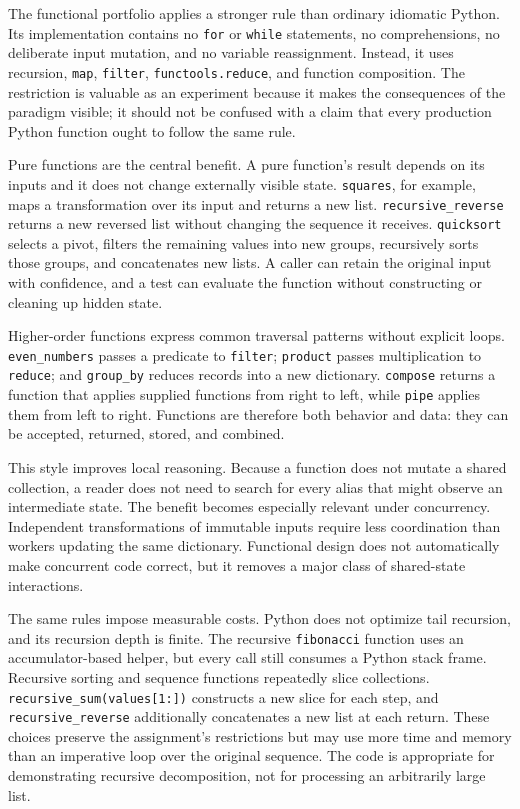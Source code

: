 \documentclass[12pt]{article}
\begin{document}
The functional portfolio applies a stronger rule than ordinary idiomatic Python. Its implementation contains no \texttt{for} or \texttt{while} statements, no comprehensions, no deliberate input mutation, and no variable reassignment. Instead, it uses recursion, \texttt{map}, \texttt{filter}, \texttt{functools.reduce}, and function composition. The restriction is valuable as an experiment because it makes the consequences of the paradigm visible; it should not be confused with a claim that every production Python function ought to follow the same rule.


Pure functions are the central benefit. A pure function's result depends on its inputs and it does not change externally visible state. \texttt{squares}, for example, maps a transformation over its input and returns a new list. \texttt{recursive\_reverse} returns a new reversed list without changing the sequence it receives. \texttt{quicksort} selects a pivot, filters the remaining values into new groups, recursively sorts those groups, and concatenates new lists. A caller can retain the original input with confidence, and a test can evaluate the function without constructing or cleaning up hidden state.


Higher-order functions express common traversal patterns without explicit loops. \texttt{even\_numbers} passes a predicate to \texttt{filter}; \texttt{product} passes multiplication to \texttt{reduce}; and \texttt{group\_by} reduces records into a new dictionary. \texttt{compose} returns a function that applies supplied functions from right to left, while \texttt{pipe} applies them from left to right. Functions are therefore both behavior and data: they can be accepted, returned, stored, and combined.


This style improves local reasoning. Because a function does not mutate a shared collection, a reader does not need to search for every alias that might observe an intermediate state. The benefit becomes especially relevant under concurrency. Independent transformations of immutable inputs require less coordination than workers updating the same dictionary. Functional design does not automatically make concurrent code correct, but it removes a major class of shared-state interactions.


The same rules impose measurable costs. Python does not optimize tail recursion, and its recursion depth is finite. The recursive \texttt{fibonacci} function uses an accumulator-based helper, but every call still consumes a Python stack frame. Recursive sorting and sequence functions repeatedly slice collections. \texttt{recursive\_sum(values[1:])} constructs a new slice for each step, and \texttt{recursive\_reverse} additionally concatenates a new list at each return. These choices preserve the assignment's restrictions but may use more time and memory than an imperative loop over the original sequence. The code is appropriate for demonstrating recursive decomposition, not for processing an arbitrarily large list.
\end{document}
